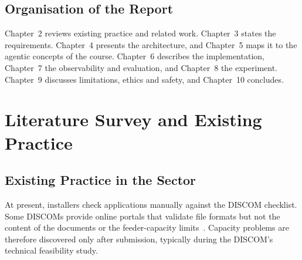 \documentclass[12pt,a4paper,oneside]{report}
\newif\ifguidance
\newcommand{\guide}[1]{%
  \ifguidance
  \begin{tcolorbox}[enhanced,breakable,colback=guidebg,colframe=bmsblue,
    boxrule=0.6pt,arc=2pt,left=6pt,right=6pt,top=4pt,bottom=4pt,
    fonttitle=\bfseries\small,title={What to write here},
    before upper={\small\setstretch{1.1}}]
  #1
  \end{tcolorbox}
  \fi}
\newcommand{\dodont}[2]{%
  \ifguidance
  \begin{tcolorbox}[enhanced,breakable,sidebyside,sidebyside align=top seam,
    colback=dobg,colbacklower=dontbg,colframe=gray!60,boxrule=0.5pt,arc=2pt,
    lefthand ratio=0.5,left=5pt,right=5pt,top=4pt,bottom=4pt,
    fontupper=\small\setstretch{1.05},fontlower=\small\setstretch{1.05}]
  \textbf{\textcolor{ForestGreen}{\checkmark\ Do}}
  \begin{itemize}[leftmargin=12pt,itemsep=1pt,topsep=2pt]#1\end{itemize}
  \tcblower
  \textbf{\textcolor{BrickRed}{$\times$ Don't}}
  \begin{itemize}[leftmargin=12pt,itemsep=1pt,topsep=2pt]#2\end{itemize}
  \end{tcolorbox}
  \fi}
\newcommand{\pagebudget}[1]{%
  \ifguidance\noindent{\small\textcolor{bmsblue}{\textbf{Expected length:} #1 pages}}\par\medskip\fi}
\newenvironment{sample}
  {\par\noindent{\footnotesize\bfseries\textcolor{BrickRed}{[SAMPLE --- replace with your own content]}}\par\color{samplecol}}
  {\par\medskip}
\begin{document}
\section{Organisation of the Report}
\guide{One short paragraph listing what each subsequent chapter contains.}
\dodont{\item Mention every chapter once.
}
{\item Do not repeat the chapter titles as a bulleted list.
}

\begin{sample}
Chapter~2 reviews existing practice and related work. Chapter~3 states the requirements.
Chapter~4 presents the architecture, and Chapter~5 maps it to the agentic concepts of the course.
Chapter~6 describes the implementation, Chapter~7 the observability and evaluation, and Chapter~8
the experiment. Chapter~9 discusses limitations, ethics and safety, and Chapter~10 concludes.
\end{sample}

\chapter{Literature Survey and Existing Practice}
\pagebudget{4--6}
\guide{Show that you understand (a) how the problem is handled today in the sector and (b) the
technical literature on the agentic techniques you use. End with a clear statement of the gap your
project addresses. Review at least 10 sources, of which at least 6 should be peer-reviewed papers.}

\section{Existing Practice in the Sector}
\guide{Describe the current manual or software process: who does it, which tools are used, and where
it fails. Use sources such as regulator documents, industry reports or interviews you conducted.}
\dodont{\item Describe the real workflow step by step.
\item Cite official or primary sources.}
{\item Do not rely only on blog posts or marketing pages.
\item Do not invent statistics.}
\begin{sample}
At present, installers check applications manually against the DISCOM checklist. Some DISCOMs
provide online portals that validate file formats but not the content of the documents or the
feeder-capacity limits~\cite{example-sop}. Capacity problems are therefore discovered only after
submission, typically during the DISCOM's technical feasibility study.
\end{sample}
\end{document}
